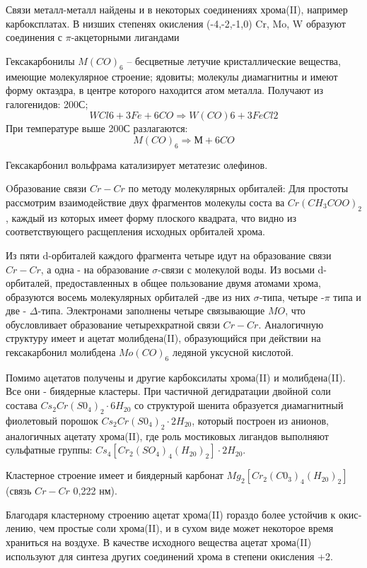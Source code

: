 \documentclass[11pt]{article}
\begin{document}
Связи металл-металл найдены и в некоторых соединениях хрома(II), например карбоксплатах. 
	В низших степенях окисления (-4,-2,-1,0) Cr, Mo, W образуют соединения с $\pi$-акцеторными лигандами
 
 Гексакарбонилы $M(CO)_6$ – бесцветные летучие кристаллические вещества, имеющие молекулярное строение; ядовиты; молекулы диамагнитны и имеют форму октаэдра, в центре которого находится атом металла.  
Получают из галогенидов:  200С; 
$$WCl6+ 3Fe + 6CO \Rightarrow W(CO)6+ 3FeCl2 $$
При температуре выше 200С разлагаются: 
$$M(CO)_6 \Rightarrow М + 6CO$$

Гексакарбонил вольфрама катализирует метатезис олефинов. 

Oбразование связи $Cr-Cr$ по методу молекулярных орбиталей: Для простоты рассмотрим взаимодействие двух фрагментов молекулы соста­ ва $Cr(CH_3COO)_2$, каждый из которых имеет форму плоского квадрата, что видно из соответствующего расщепления исходных  орбиталей хрома. 

Из пяти d-орбиталей каждого фрагмента четыре идут на образование связи $Cr-Cr$, а одна - на образование $\sigma$-связи с молекулой воды. Из восьми d-орбиталей, предоставленных в общее пользование двумя атомами хрома, образуются восемь молекулярных орбиталей -две из них $\sigma$-типа, четыре -$\pi$ типа и две - $\Delta$-типа. Электронами заполнены четыре связывающие $MO$, что обусловливает образование четырехкратной связи $Cr-Cr$. Аналогичную структуру имеет и ацетат молибдена(II), образующийся при действии на гексакарбонил молибдена $Mo(CO)_6$ ледяной уксусной кислотой.
 
Помимо ацетатов получены и другие карбоксилаты хрома(II) и молибдена(II). Все они - биядерные кластеры. При частичной дегидратации двойной соли состава $Cs_2Cr(S0_4)_2\cdot6H_20$ со структурой шенита образуется диамагнитный фиолетовый порошок $Cs_2Cr(S0_4)_2\cdot2H_20$, который построен из анионов, аналогичных ацетату хрома(II), где роль мостиковых лигандов выполняют сульфатные группы: 
$Cs_4[Cr_2(SO_4)_4(H_20 )_2]\cdot 2H_20$.

 Кластерное строение имеет и биядерный карбонат 
$Mg_2[Cr_2(C0_3)_4(H_20)_2]$ (связь $Cr-Cr$ 0,222 нм). 

Благодаря кластерному строению ацетат хрома(II) гораздо более устойчив к окис­ лению, чем простые соли хрома(II), и в сухом виде может некоторое время храниться на воздухе. В качестве исходного вещества ацетат хрома(II) используют для синтеза других соединений хрома в степени окисления +2. 
\end{document}

